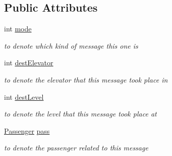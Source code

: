 \subsection*{Public Attributes}
\begin{DoxyCompactItemize}
\item 
\mbox{\label{classcn_1_1leonwong_1_1_elevator_simulator_1_1_model_1_1_message_a1c8801fa247ef11986bada2b1916e7e9}} 
int \hyperlink{classcn_1_1leonwong_1_1_elevator_simulator_1_1_model_1_1_message_a1c8801fa247ef11986bada2b1916e7e9}{mode}
\begin{DoxyCompactList}\small\item\em to denote which kind of message this one is \end{DoxyCompactList}\item 
\mbox{\label{classcn_1_1leonwong_1_1_elevator_simulator_1_1_model_1_1_message_a2f04cd7e8b278e50a64d9c35164e28ff}} 
int \hyperlink{classcn_1_1leonwong_1_1_elevator_simulator_1_1_model_1_1_message_a2f04cd7e8b278e50a64d9c35164e28ff}{dest\+Elevator}
\begin{DoxyCompactList}\small\item\em to denote the elevator that this message took place in \end{DoxyCompactList}\item 
\mbox{\label{classcn_1_1leonwong_1_1_elevator_simulator_1_1_model_1_1_message_a46cbc9bbeaed1cdc3ad481e17a3f13f8}} 
int \hyperlink{classcn_1_1leonwong_1_1_elevator_simulator_1_1_model_1_1_message_a46cbc9bbeaed1cdc3ad481e17a3f13f8}{dest\+Level}
\begin{DoxyCompactList}\small\item\em to denote the level that this message took place at \end{DoxyCompactList}\item 
\mbox{\label{classcn_1_1leonwong_1_1_elevator_simulator_1_1_model_1_1_message_ab4f4959e7867933efc65c6279ee36670}} 
\hyperlink{classcn_1_1leonwong_1_1_elevator_simulator_1_1_model_1_1_passenger}{Passenger} \hyperlink{classcn_1_1leonwong_1_1_elevator_simulator_1_1_model_1_1_message_ab4f4959e7867933efc65c6279ee36670}{pass}
\begin{DoxyCompactList}\small\item\em to denote the passenger related to this message \end{DoxyCompactList}\end{DoxyCompactItemize}
